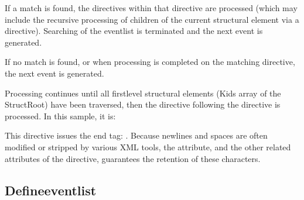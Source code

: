 \documentclass[letterpaper,12pt,english,openany,oneside]{sphinxmanual}
\begin{document}
If a match is found, the directives within that  directive are processed (which may include the recursive processing of children of the current structural element via a  directive). Searching of the event\sphinxhyphen{}list is terminated and the next event is generated.

If no match is found, or when processing is completed on the matching  directive, the next event is generated.

Processing continues until all first\sphinxhyphen{}level structural elements (Kids array of the StructRoot) have been traversed, then the directive following the  directive is processed. In this sample, it is:

\begin{sphinxVerbatim}[commandchars=\\\{\}]
    
\end{sphinxVerbatim}

This  directive issues the end tag: . Because newlines and spaces are often modified or stripped by various XML tools, the  attribute, and the other related attributes of the  directive, guarantees the retention of these characters.


\subsection{Define\sphinxhyphen{}event\sphinxhyphen{}list}
\label{\detokenize{index:define-event-list}}
\begin{sphinxVerbatim}[commandchars=\\\{\}]
   
\end{sphinxVerbatim}
\end{document}
